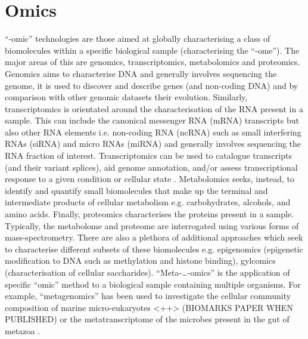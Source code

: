 \section{Omics}
``-omic'' technologies are those aimed at globally characterising a class of biomolecules 
within a specific biological sample (characterising the ``-ome''). The major areas of this
are genomics, transcriptomics, metabolomics and proteomics. 
Genomics aims to characterise DNA and generally involves sequencing the genome, it is used
to discover and describe genes (and non-coding DNA) and by comparison with other genomic
datasets their evolution.  Similarly, transcriptomics is orientated 
around the characterisation of the RNA present in a sample.  This can include
the canonical messenger RNA (mRNA) transcripts but also other RNA elements i.e.
non-coding RNA (ncRNA) such as small interfering RNAs (siRNA) and micro RNAs (miRNA) and
generally involves sequencing the RNA fraction of interest.
Transcriptomics can be used to catalogue transcripts (and their variant splices), 
aid genome annotation,  and/or assess transcriptional response to a given condition or cellular state \citep{Wang2009}.
Metabolomics seeks, instead, to identify and quantify small biomolecules that make up the terminal and
intermediate products of cellular metabolism e.g. carbohydrates, alcohols, and amino acids.  
Finally, proteomics characterises the proteins present in a sample. 
Typically, the metabolome and proteome are interrogated using various forms of mass-spectrometry.
There are also a plethora of additional approaches which seek to characterise
different subsets of these biomolecules e.g. epigenomics (epigenetic modification to DNA such as methylation
and histone binding), gylcomics (characterisation of cellular saccharides).
``Meta-\ldots-omics'' is the application of specific ``omic'' method to a biological sample 
containing multiple organisms. For example, ``metagenomics'' has been used to investigate
the cellular community composition of marine micro-eukaryotes \citep{}<++> (BIOMARKS PAPER WHEN PUBLISHED) %
or the metatranscriptome of the microbes present in the gut of metazoa \citep{}.



